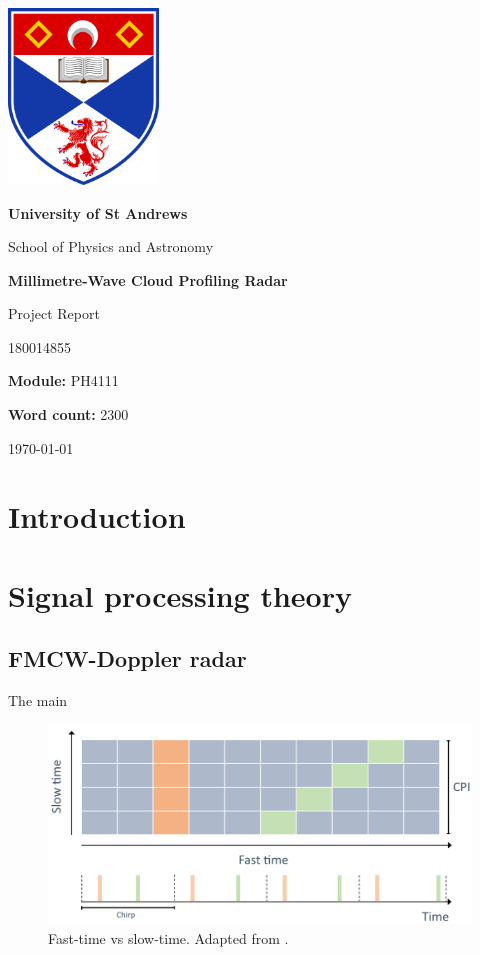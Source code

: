 \documentclass{article}
\title {\mytitle}
\author{\myauthor}
\date  {\mydate}
\newcommand\mytitle    {Millimetre-Wave Cloud Profiling Radar}
\newcommand\mysubtitle {Project Report}
\newcommand\myauthor   {180014855}
\newcommand\mymodule   {PH4111}
\newcommand\mywordcount{2300}
\begin{document}
\begin{titlepage}
	\centering
	{\includegraphics[width=0.3\textwidth]{uos-logo}}
	\par
	{\LARGE\bfseries University of St Andrews\par}
	{\LARGE School of Physics and Astronomy\par}
	\vspace{1.5cm}
	{\huge\bfseries\mytitle\par}
	{\Large\mysubtitle\par}
	\vspace{2cm}
	{\Large\myauthor\par}
	{\large\textbf{Module:} \mymodule\par}
	{\large\textbf{Word count:} \mywordcount\par}
	\vfill
	{\large\today\par}
\end{titlepage}

\begin{abstract}
	Insert abstract here.
\end{abstract}

\tableofcontents

\section{Introduction}

\section{Signal processing theory}
\subsection{FMCW-Doppler radar}
The main 


\begin{figure}
	\centering
	\includegraphics[width=\textwidth]{slow-fast-time}
	\caption{Fast-time vs slow-time. Adapted from \cite{SlowFastTimeFig}.}
	\label{fig:SlowFastTime}
\end{figure}
\end{document}

